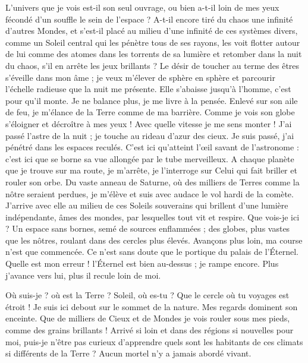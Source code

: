 \documentclass[a4paper, 11pt, oneside, landscape]{article}
\begin{document}
L'univers que je vois est-il son seul ouvrage, ou bien a-t-il loin de mes yeux fécondé d'un souffle le sein de l'espace ? A-t-il encore tiré du chaos une infinité d'autres Mondes, et s'est-il placé au milieu d'une infinité de ces systèmes divers, comme un Soleil central qui les pénètre tous de ses rayons, les voit flotter autour de lui comme des atomes dans les torrents de sa lumière et retomber dans la nuit du chaos, s'il en arrête les jeux brillants ? Le désir de toucher au terme des êtres s'éveille dans mon âme ; je veux m'élever de sphère en sphère et parcourir l'échelle radieuse que la nuit me présente. Elle s'abaisse jusqu'à l'homme, c'est pour qu'il monte. Je ne balance plus, je me livre à la pensée. Enlevé sur son aile de feu, je m'élance de la Terre comme de ma barrière. Comme je vois son globe s'éloigner et décroître à mes yeux ! Avec quelle vitesse je me sens monter ! J'ai passé l'astre de la nuit ; je touche au rideau d'azur des cieux. Je suis passé, j'ai pénétré dans les espaces reculés. C'est ici qu'atteint l'œil savant de l'astronome : c'est ici que se borne sa vue allongée par le tube merveilleux. A chaque planète que je trouve sur ma route, je m'arrête, je l'interroge sur Celui qui fait briller et rouler son orbe. Du vaste anneau de Saturne, où des milliers de Terres comme la nôtre seraient perdues, je m'élève et suis avec audace le vol hardi de la comète. J'arrive avec elle au milieu de ces Soleils souverains qui brillent d'une lumière indépendante, âmes des mondes, par lesquelles tout vit et respire. Que vois-je ici ? Un espace sans bornes, semé de sources enflammées ; des globes, plus vastes que les nôtres, roulant dans des cercles plus élevés. Avançons plus loin, ma course n'est que commencée. Ce n'est sans doute que le portique du palais de l'Éternel. Quelle est mon erreur ! l'Éternel est bien au-dessus ; je rampe encore. Plus j'avance vers lui, plus il recule loin de moi.

Où suis-je ? où est la Terre ? Soleil, où es-tu ? Que le cercle où tu voyages est étroit ! Je suis ici debout sur le sommet de la nature. Mes regards dominent son enceinte. Que de milliers de Cieux et de Mondes je vois rouler sous mes pieds, comme des grains brillants ! Arrivé si loin et dans des régions si nouvelles pour moi, puis-je n'être pas curieux d'apprendre quels sont les habitants de ces climats si différents de la Terre ? Aucun mortel n'y a jamais abordé vivant.
\end{document}
